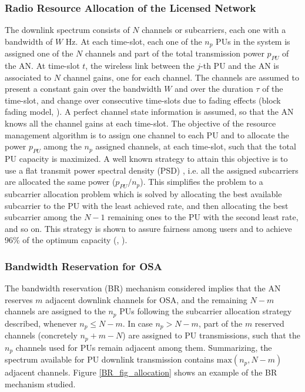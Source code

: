 \subsubsection{Radio Resource Allocation of the Licensed Network} 
The downlink spectrum consists of $N$ channels or subcarriers, each one with a bandwidth of $W$ Hz. At each time-slot, each one of the $n_{p}$ PUs in the system is assigned one of the $N$ channels and part of the total transmission power $p_{PU}$ of the AN.
At time-slot $t$, the wireless link between the $j$-th PU and the AN is associated to $N$ channel gains, one for each channel. The channels are assumed to present a constant gain over the bandwidth $W$ and over the duration $\tau$ of the time-slot, and change over consecutive time-slots due to fading effects (block fading model, \cite{ref:Goldsmith}).
A perfect channel state information is assumed, so that the AN knows all the channel gains at each time-slot.
The objective of the resource management algorithm is to assign one channel to each PU and to allocate the power $p_{PU}$ among the $n_{p}$ assigned channels, at each time-slot, such that the total PU capacity is maximized.
A well known strategy to attain this objective is to use a flat transmit power spectral density (PSD) \cite{ref:PSD}, i.e. all the assigned subcarriers are allocated the same power ($p_{PU}/n_{p}$). This simplifies the problem to a subcarrier allocation problem which is solved by allocating the best available subcarrier to the PU with the least achieved rate, and then allocating the best subcarrier among the $N-1$ remaining ones to the PU with the second least rate, and so on. This strategy is shown to assure fairness among users and to achieve 96\% of the optimum capacity (\cite{ref:PSD}, \cite{ref:OFDMtutorial}).

\subsubsection{Bandwidth Reservation for OSA} 
The bandwidth reservation (BR) mechanism considered implies that the AN reserves $m$ adjacent downlink channels for OSA, and the remaining $N-m$ channels are assigned to the $n_{p}$ PUs following the subcarrier allocation strategy described, whenever $n_{p}\leq N-m$. In case $n_{p}>N-m$, part of the $m$ reserved channels (concretely $n_{p}+m-N$) are assigned to PU transmissions, such that the $n_{p}$ channels used for PUs remain adjacent among them. Summarizing, the spectrum available for PU downlink transmission contains $\text{max}\left(n_{p},N-m\right)$ adjacent channels. Figure \ref{BR_fig_allocation} shows an example of the BR mechanism studied.

